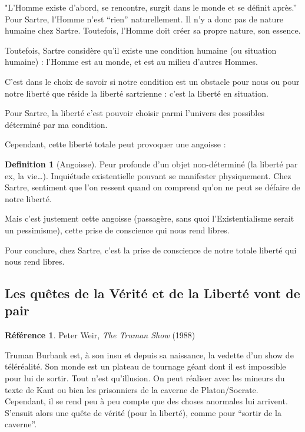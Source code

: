 \documentclass[french]{book}
\theoremstyle{definition}
\newtheorem*{dfn}{Definition}
\newtheorem*{refe}{Référence}
\begin{document}
"L'Homme existe d’abord, se rencontre, surgit dans le monde et se définit après.”
Pour Sartre, l’Homme n’est “rien” naturellement. Il n’y a donc pas de nature humaine chez Sartre. Toutefois, l’Homme doit créer sa propre nature, son essence.

Toutefois, Sartre considère qu’il existe une condition humaine (ou situation humaine) : l’Homme est au monde, et est au milieu d’autres Hommes.

C’est dans le choix de savoir si notre condition est un obstacle pour nous ou pour notre liberté que réside la liberté sartrienne : c’est la liberté en situation.

Pour Sartre, la liberté c’est pouvoir choisir parmi l’univers des possibles déterminé par ma condition.

Cependant, cette liberté totale peut provoquer une angoisse :

\begin{dfn}[Angoisse]
Peur profonde d’un objet non-déterminé (la liberté par ex, la vie…). Inquiétude existentielle pouvant se manifester physiquement. Chez Sartre, sentiment que l’on ressent quand on comprend qu’on ne peut se défaire de notre liberté.
\end{dfn}

Mais c’est justement cette angoisse (passagère, sans quoi l’Existentialisme serait un pessimisme), cette prise de conscience qui nous rend libres.

Pour conclure, chez Sartre, c’est la prise de conscience de notre totale liberté qui nous rend libres.

\subsection{Les quêtes de la Vérité et de la Liberté vont de pair}

\begin{refe}
	Peter Weir, \textit{The Truman Show} (1988)
\end{refe}

Truman Burbank est, à son insu et depuis sa naissance, la vedette d’un show de téléréalité. Son monde est un plateau de tournage géant dont il est impossible pour lui de sortir. Tout n’est qu’illusion. On peut réaliser avec les mineurs du texte de Kant ou bien les prisonniers de la caverne de Platon/Socrate. Cependant, il se rend peu à peu compte que des choses anormales lui arrivent. S’ensuit alors une quête de vérité (pour la liberté), comme pour “sortir de la caverne”.
\end{document}
